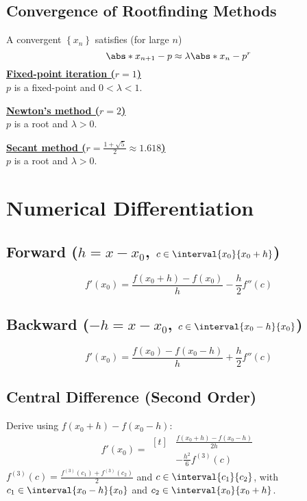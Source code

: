 \documentclass{article}
\begin{document}
\begin{minipage}[t]{62.39259259mm}
    \subsection{Convergence of Rootfinding Methods}
    A convergent \(\left\{ x_n \right\}\) satisfies (for large \(n\))
    \begin{equation*}
        \abs*{x_{n + 1} - p} \approx \lambda \abs*{x_n - p}^r
    \end{equation*}
    \underline{\textbf{Fixed-point iteration (\(r = 1\))}} \\
    \(p\) is a fixed-point and \(0 < \lambda < 1\).

    \underline{\textbf{Newton's method (\(r = 2\))}} \\
    \(p\) is a root and \(\lambda > 0\).

    \underline{\textbf{Secant method (\(r = \tfrac{1 + \sqrt{5}}{2} \approx 1.618\))}} \\
    \(p\) is a root and \(\lambda > 0\).
    \section{Numerical Differentiation}
    \subsection{Forward (\texorpdfstring{\(h = x - x_0\)}{h = x - x0}, \texorpdfstring{\(c \in \interval{x_0}{x_0 + h}\)}{c in [x0, x0 + h]})}
    \begin{equation*}
        f'\left( x_0 \right) = \frac{f\left( x_0 + h \right) - f\left( x_0 \right)}{h} - \frac{h}{2} f''\left( c \right)
    \end{equation*}
    \subsection{Backward (\texorpdfstring{\(-h = x - x_0\)}{-h = x - x0}, \texorpdfstring{\(c \in \interval{x_0 - h}{x_0}\)}{c in [x0 - h, x0]})}
    \begin{equation*}
        f'\left( x_0 \right) = \frac{f\left( x_0 \right) - f\left( x_0 - h \right)}{h} + \frac{h}{2} f''\left( c \right)
    \end{equation*}
    \subsection{Central Difference (Second Order)}
    Derive using \(f\left( x_0 + h \right) - f\left( x_0 - h \right)\):
    \begin{equation*}
        f'\left( x_0 \right) = \begin{aligned}[t]
             & \frac{f\left( x_0 + h \right) - f\left( x_0 - h \right)}{2h} \\
             & - \frac{h^2}{6} f^{\left( 3 \right)}\left( c \right)
        \end{aligned}
    \end{equation*}
    \(f^{\left( 3 \right)}\left( c \right) = \frac{f^{\left( 3 \right)}\left( c_1 \right) + f^{\left( 3 \right)}\left( c_2 \right)}{2}\) and \(c \in \interval{c_1}{c_2}\),
    with \(c_1 \in \interval{x_0 - h}{x_0}\) and \(c_2 \in \interval{x_0}{x_0 + h}\).

\end{minipage}
\end{document}
